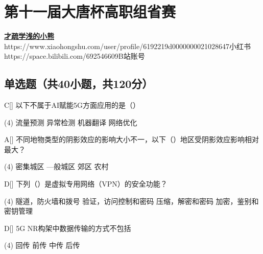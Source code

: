 \chapter{第十一届大唐杯高职组省赛}
\fancyhead[R]{\color{H6}\kaishu\rightmark\,}

\date{2024年4月19日}{}{\href{https://github.com/xubenshan/dtcup}{\textbf{才疏学浅的小熊}}}
{}
{https://www.xiaohongshu.com/user/profile/6192219d0000000021028647}{小红书}
{https://space.bilibili.com/692546609}{B站账号}


\section{单选题（共40小题，共120分）}



\begin{choice}{C}[]
    以下不属于AI赋能5G方面应用的是（\quad）
    \begin{tasks}(4)
        \task 流量预测
        \task 异常检测
        \task 机器翻译
        \task 网络优化
    \end{tasks}
\end{choice}


\begin{choice}{A}[]
    不同地物类型的阴影效应的影响大小不一，以下（\quad）地区受阴影效应影响相对最大？
    \begin{tasks}(4)
        \task 密集城区
        \task —般城区
        \task 郊区
        \task 农村
    \end{tasks}
\end{choice}




\begin{choice}{D}[]
    下列（\quad）是虚拟专用网络（VPN）的安全功能？
    \begin{tasks}(4)
        \task 隧道，防火墙和拨号
        \task 验证，访问控制和密码
        \task 压缩，解密和密码
        \task 加密，鉴别和密钥管理
    \end{tasks}
\end{choice}




\begin{choice}{D}[]
    5G NR构架中数据传输的方式不包括
    \begin{tasks}(4)
        \task 回传
        \task 前传
        \task 中传
        \task 后传
    \end{tasks}
\end{choice}


